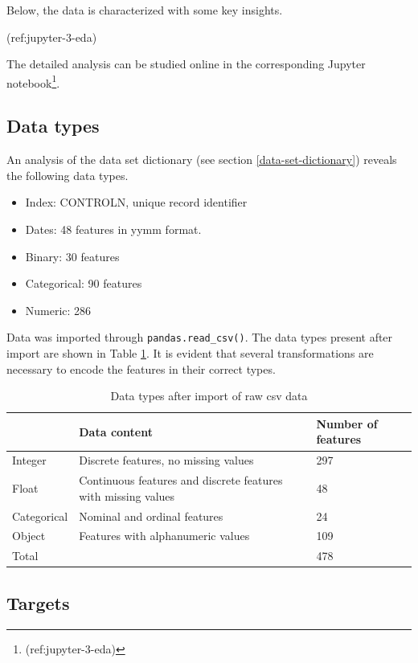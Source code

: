 \documentclass[
  11pt,
  a4paper,
  DIV=12,captions=tableheading,oneside,titlepage=firstiscover,abstracton]{scrreprt}
\providecommand{\tightlist}{%
  \setlength{\itemsep}{0pt}\setlength{\parskip}{0pt}}
\providecommand{\tightlist}{%
  \setlength{\itemsep}{0pt}\setlength{\parskip}{0pt}}
\begin{document}
Below, the data is characterized with some key insights.

(ref:jupyter-3-eda)

The detailed analysis can be studied online in the corresponding Jupyter notebook\footnote{(ref:jupyter-3-eda)}.

\hypertarget{data-types}{%
\subsection{Data types}\label{data-types}}

An analysis of the data set dictionary (see section \ref{data-set-dictionary}) reveals the following data types.

\begin{itemize}
\tightlist
\item
  Index: CONTROLN, unique record identifier
\item
  Dates: 48 features in yymm format.
\item
  Binary: 30 features
\item
  Categorical: 90 features
\item
  Numeric: 286
\end{itemize}

Data was imported through \texttt{pandas.read\_csv()}. The data types present after import are shown in Table \ref{tab:data-desc}. It is evident that several transformations are necessary to encode the features in their correct types.

\begin{table}[!h]

\caption{\label{tab:data-desc}Data types after import of raw csv data}
\centering
\begin{tabular}{l>{\raggedright\arraybackslash}p{6cm}l}
\toprule
  & Data content & Number of features\\
\midrule
Integer & Discrete features, no missing values & 297\\
Float & Continuous features and discrete features with missing values & 48\\
Categorical & Nominal and ordinal features & 24\\
Object & Features with alphanumeric values & 109\\
Total &  & 478\\
\bottomrule
\end{tabular}
\end{table}

\hypertarget{targets}{%
\subsection{Targets}\label{targets}}
\end{document}
